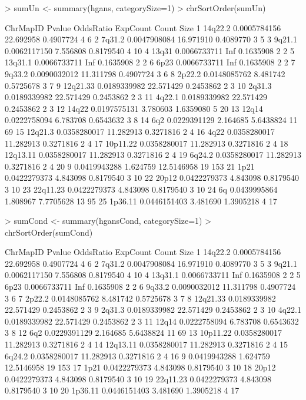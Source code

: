 \documentclass[11pt]{article}
\begin{document}
\begin{Schunk}
\begin{Sinput}
> sumUn <- summary(hgans, categorySize=1)
> chrSortOrder(sumUn)
\end{Sinput}
\begin{Soutput}
   ChrMapID       Pvalue OddsRatio   ExpCount Count Size
1   14q22.2 0.0005784156 22.692958  0.4907724     4    6
2    7q31.2 0.0047908084 16.971910  0.4089770     3    5
3    9q21.1 0.0062117150  7.556808  0.8179540     4   10
4     13q31 0.0066733711       Inf  0.1635908     2    2
5   13q31.1 0.0066733711       Inf  0.1635908     2    2
6      6p23 0.0066733711       Inf  0.1635908     2    2
7    9q33.2 0.0090032012 11.311798  0.4907724     3    6
8    2p22.2 0.0148085762  8.481742  0.5725678     3    7
9  12q21.33 0.0189339982 22.571429  0.2453862     2    3
10   2q31.3 0.0189339982 22.571429  0.2453862     2    3
11   4q22.1 0.0189339982 22.571429  0.2453862     2    3
12    14q22 0.0197575131  3.780603  1.6359080     5   20
13    12q14 0.0222758094  6.783708  0.6543632     3    8
14      6q2 0.0229391129  2.164685  5.6438824    11   69
15  12q21.3 0.0358280017 11.282913  0.3271816     2    4
16     4q22 0.0358280017 11.282913  0.3271816     2    4
17 10p11.22 0.0358280017 11.282913  0.3271816     2    4
18 12q13.11 0.0358280017 11.282913  0.3271816     2    4
19   6q24.2 0.0358280017 11.282913  0.3271816     2    4
20        9 0.0419943288  1.624759 12.5146958    19  153
21     1p21 0.0422279373  4.843098  0.8179540     3   10
22    20p12 0.0422279373  4.843098  0.8179540     3   10
23 22q11.23 0.0422279373  4.843098  0.8179540     3   10
24       6q 0.0439995864  1.808967  7.7705628    13   95
25  1p36.11 0.0446151403  3.481690  1.3905218     4   17
\end{Soutput}
\begin{Sinput}
> sumCond <- summary(hgansCond, categorySize=1)
> chrSortOrder(sumCond)
\end{Sinput}
\begin{Soutput}
   ChrMapID       Pvalue OddsRatio   ExpCount Count Size
1   14q22.2 0.0005784156 22.692958  0.4907724     4    6
2    7q31.2 0.0047908084 16.971910  0.4089770     3    5
3    9q21.1 0.0062117150  7.556808  0.8179540     4   10
4   13q31.1 0.0066733711       Inf  0.1635908     2    2
5      6p23 0.0066733711       Inf  0.1635908     2    2
6    9q33.2 0.0090032012 11.311798  0.4907724     3    6
7    2p22.2 0.0148085762  8.481742  0.5725678     3    7
8  12q21.33 0.0189339982 22.571429  0.2453862     2    3
9    2q31.3 0.0189339982 22.571429  0.2453862     2    3
10   4q22.1 0.0189339982 22.571429  0.2453862     2    3
11    12q14 0.0222758094  6.783708  0.6543632     3    8
12      6q2 0.0229391129  2.164685  5.6438824    11   69
13 10p11.22 0.0358280017 11.282913  0.3271816     2    4
14 12q13.11 0.0358280017 11.282913  0.3271816     2    4
15   6q24.2 0.0358280017 11.282913  0.3271816     2    4
16        9 0.0419943288  1.624759 12.5146958    19  153
17     1p21 0.0422279373  4.843098  0.8179540     3   10
18    20p12 0.0422279373  4.843098  0.8179540     3   10
19 22q11.23 0.0422279373  4.843098  0.8179540     3   10
20  1p36.11 0.0446151403  3.481690  1.3905218     4   17
\end{Soutput}
\end{Schunk}
\end{document}
